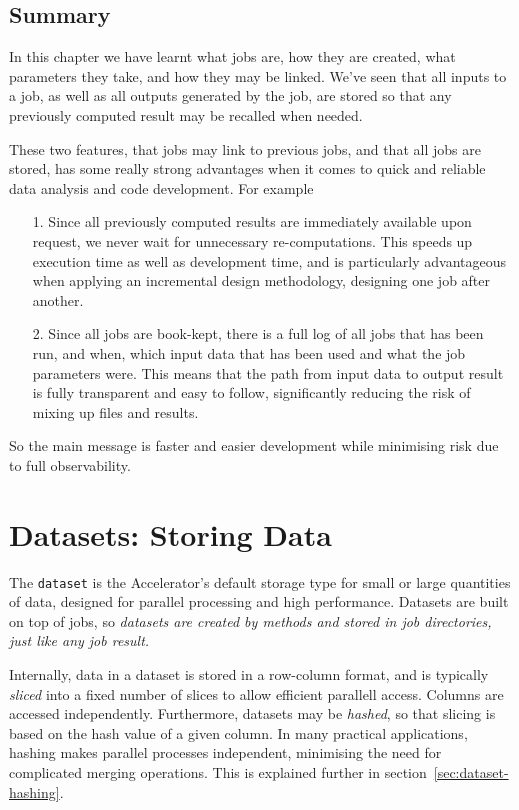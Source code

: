 \documentclass[a4paper]{article}
\begin{document}
\subsection{Summary}
In this chapter we have learnt what jobs are, how they are created,
what parameters they take, and how they may be linked.  We've seen
that all inputs to a job, as well as all outputs generated by the job,
are stored so that any previously computed result may be recalled when
needed.

These two features, that jobs may link to previous jobs, and that all
jobs are stored, has some really strong advantages when it comes to
quick and reliable data analysis and code development.  For example
\begin{itemize}
  \item[1.] Since all previously computed results are immediately
    available upon request, we never wait for unnecessary
    re-computations.  This speeds up execution time as well as
    development time, and is particularly advantageous when applying
    an incremental design methodology, designing one job after
    another.
  \item[2.] Since all jobs are book-kept, there is a full log of all
    jobs that has been run, and when, which input data that has been
    used and what the job parameters were.  This means that the path
    from input data to output result is fully transparent and easy to
    follow, significantly reducing the risk of mixing up files and
    results.
\end{itemize}
So the main message is faster and easier development while minimising
risk due to full observability.

\clearpage





\section{Datasets: Storing Data}

The \texttt{dataset} is the Accelerator's default storage type for
small or large quantities of data, designed for parallel processing
and high performance.  Datasets are built on top of jobs, so
\emph{datasets are created by methods and stored in job directories,
  just like any job result.}

Internally, data in a dataset is stored in a row-column format, and is
typically \emph{sliced} into a fixed number of slices to allow
efficient parallell access.  Columns are accessed independently.
Furthermore, datasets may be \textsl{hashed}, so that slicing is based
on the hash value of a given column.  In many practical applications,
hashing makes parallel processes independent, minimising the need for
complicated merging operations.  This is explained further in
section~\ref{sec:dataset-hashing}.
\end{document}

